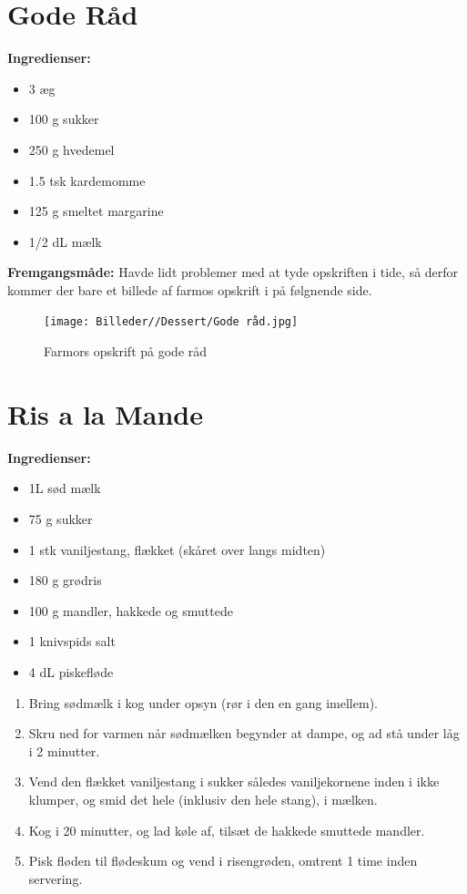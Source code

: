 \documentclass{book}
\begin{document}
\newpage \section{Gode Råd}
\begin{minipage}[t]{0.5\textwidth}
\textbf{Ingredienser:}
\begin{itemize}
    \item 3 æg
    \item 100 g sukker
    \item 250 g hvedemel
    \item 1.5 tsk kardemomme 
    \item 125 g smeltet margarine
    \item 1/2 dL mælk
\end{itemize}
\end{minipage}
\begin{minipage}[t]{0.5\textwidth}
\textbf{Fremgangsmåde:}
Havde lidt problemer med at tyde opskriften i tide, så derfor kommer der bare et billede af farmos opskrift i på følgnende side.
\end{minipage}
\newpage \begin{figure}[h]
    \centering
    \texttt{[image: Billeder//Dessert/Gode råd.jpg]}
    \caption{Farmors opskrift på gode råd}
\end{figure}
\newpage \section{Ris a la Mande}
\begin{minipage}[t]{0.5\textwidth}
\textbf{Ingredienser:}
\begin{itemize}
    \item 1L sød mælk
    \item 75 g sukker
    \item 1 stk vaniljestang, flækket (skåret over langs midten)
    \item 180 g grødris
    \item 100 g mandler, hakkede og smuttede
    \item 1 knivspids salt
    \item 4 dL piskefløde
\end{itemize}
\end{minipage}
\begin{minipage}[t]{0.5\textwidth}
\begin{enumerate}
    \item Bring sødmælk i kog under opsyn (rør i den en gang imellem).
    \item Skru ned for varmen når sødmælken begynder at dampe, og ad stå under låg i 2 minutter.
    \item Vend den flækket vaniljestang i sukker således vaniljekornene inden i ikke klumper, og smid det hele (inklusiv den hele stang), i mælken. 
\item Kog i 20 minutter, og lad køle af, tilsæt de hakkede smuttede mandler.
\item Pisk fløden til flødeskum og vend i risengrøden, omtrent 1 time inden servering.
\end{enumerate}
\end{minipage}
\end{document}
